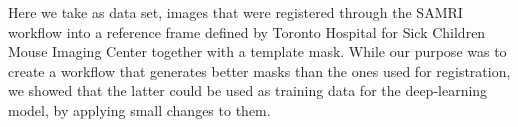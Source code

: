 Here we take as data set, images that were registered through the SAMRI workflow into a reference frame defined by Toronto Hospital for Sick Children Mouse Imaging Center %
together with a template mask.
While our purpose was to create a workflow that generates better masks than the ones used for registration, we showed that the latter could be used as training data for the deep-learning model, by applying small changes to them.
